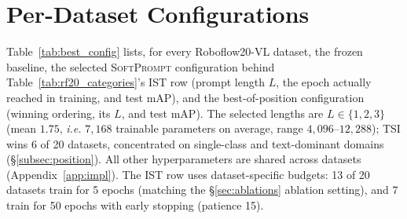 \documentclass{article}
\newcommand{\ours}{\textsc{SoftPrompt}}
\newcommand{\rftwenty}{Roboflow20-VL}
\newcommand{\eg}{\textit{e.g.}}
\newcommand{\ie}{\textit{i.e.}}
\begin{document}
\section{Per-Dataset Configurations}
\label{app:best_config}

Table~\ref{tab:best_config} lists, for every \rftwenty{} dataset, the frozen baseline, the selected \ours{} configuration behind Table~\ref{tab:rf20_categories}'s IST row (prompt length $L$, the epoch actually reached in training, and test mAP), and the best-of-position configuration (winning ordering, its $L$, and test mAP).
The selected lengths are $L \in \{1,2,3\}$ (mean $1.75$, \ie{} $7{,}168$ trainable parameters on average, range $4{,}096$--$12{,}288$); TSI wins 6 of 20 datasets, concentrated on single-class and text-dominant domains (\S\ref{subsec:position}).
All other hyperparameters are shared across datasets (Appendix~\ref{app:impl}).
The IST row uses dataset-specific budgets: 13 of 20 datasets train for 5 epochs (matching the \S\ref{sec:ablations} ablation setting), and 7 train for 50 epochs with early stopping (patience 15).
\end{document}

